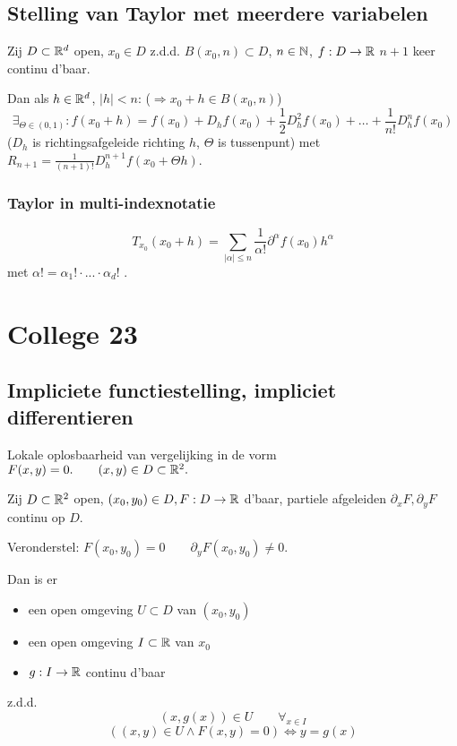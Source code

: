 \documentclass{2wa40summary}
\begin{document}
		\subsection{Stelling van Taylor met meerdere variabelen}
			\theorem Zij  $D \subset \mathbb{R}^d$ open, $x_0 \in D$ z.d.d. $B(x_0,n) \subset D$, $n\in \mathbb{N}$, $f:D\to \mathbb{R}$ $n+1$ keer continu d'baar.
			
			Dan als $h \in \mathbb{R}^d$, $ |h|<n $: ($\Rightarrow x_0+h \in B(x_0,n)$)
			\[ \exists_{\Theta \in (0,1)}:f(x_0+h) = f(x_0) + D_h f(x_0) + \frac{1}{2} D_h^2 f(x_0) + \dots + \frac{1}{n!} D_h^n f(x_0) \]
			($D_h$ is richtingsafgeleide richting $h$, $\Theta$ is tussenpunt)
			met $R_{n+1} = \frac{1}{(n+1)!}D_h^{n+1} f(x_0 + \Theta h)$.
		
			\subsubsection{Taylor in multi-indexnotatie}
				\[ T_{x_0} (x_0 + h) = \sum_{|\alpha|\le n} \frac{1}{\alpha !} \partial^\alpha f(x_0)h^\alpha \] met $ \alpha ! = \alpha_1 ! \cdot ... \cdot \alpha_d !$ .
		
	\newpage
	\section{College 23}
		\subsection{Impliciete functiestelling, impliciet differentieren}
			Lokale oplosbaarheid van vergelijking in de vorm $ F(x,y)=0. \qquad (x,y) \in D \subset \mathbb{R}^2. $
			
			 Zij $D \subset \mathbb{R}^2$ open, $ (x_0 , y_0 ) \in D, F:D \rightarrow \mathbb{R} $ d'baar, partiele afgeleiden $ \partial_x F, \partial_y F $ continu op $ D $.
			
			Veronderstel: $ F(x_0, y_0) = 0 \qquad \partial_y F(x_0, y_0)\neq 0 $.
			
			Dan is er 
			\begin{itemize} 
				\item[] een open omgeving $ U \subset D $ van $ (x_0,y_0) $
				\item[] een open omgeving $ I \subset \mathbb{R} $ van $ x_0 $
				\item[] $ g: I \rightarrow \mathbb{R} $ continu d'baar 
			\end{itemize}
			z.d.d.
			\[ (x,g(x)) \in U \qquad \forall_{x \in I} \]
			\[ ((x,y) \in U \wedge F(x,y)=0) \Leftrightarrow y=g(x) \]
			
\end{document}
